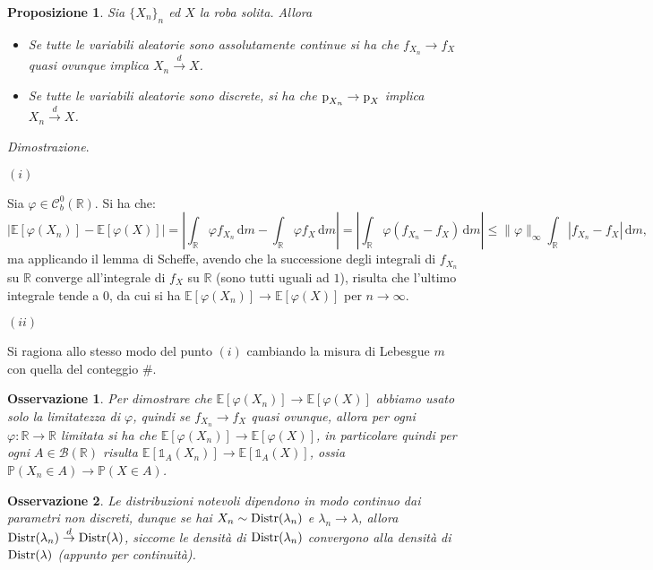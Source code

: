 \documentclass[11pt]{book}
\makeatletter
\theoremstyle{Definizione}
\theoremstyle{TeoremaProposizioneLemmaCorollario}
\newtheorem{mypropo}[myteo]{Proposizione}
\theoremstyle{OsservazioneNota}
\newtheorem{myobs}{Osservazione}[section]
\renewenvironment{proof}[1][\proofname]{\par
  \normalfont \topsep6\p@\@plus6\p@\relax
  \trivlist
  \item[\hskip\labelsep
        \itshape
    #1\@addpunct{.}]\ignorespaces
}{%
  \endtrivlist\@endpefalse
}
\newcommand{\R}{\mathbb{R}}
\renewcommand{\P}{\mathbb{P}}
\renewcommand{\d}{\mathrm{d}}
\newcommand{\dm}{\,\d \textit{m}}
\newcommand{\p}{\textup{p}}
\newcommand{\E}{\mathbb{E}}
\newcommand{\uno}[1]{\mathds{1}_{#1}}
\newcommand{\tod}{\overset{d}{\to}}
\renewenvironment{proof}{\textsl{Dimostrazione}.}{}
\makeatother
\begin{document}
\begin{boxpro}
\begin{mypropo}
Sia $\{X_n\}_n$ ed $X$ la roba solita. Allora
\begin{itemize}
\item[$(i)$] Se tutte le variabili aleatorie sono assolutamente continue si ha che $f_{X_n } \to f_X$ quasi ovunque implica $X_n \tod X$.
\item[$(ii)$] Se tutte le variabili aleatorie sono discrete, si ha che $\p_{X_n} \to \p_X$ implica $X_n\tod X$.
\end{itemize}
\end{mypropo}
\tcblower
\begin{proof}
\hfill
\begin{flushleft}
$(i)$
\end{flushleft}
Sia $\varphi\in \mathcal{C}_b^0(\R)$. Si ha che:
$$
\big|\E[\varphi(X_n)]-\E[\varphi(X)]\big| = \left|\int_\R \varphi f_{X_n} \dm -\int_\R \varphi f_{X}\dm\right| = \left|\int_\R \varphi(f_{X_n}-f_X)\dm\right|\leq \|\varphi\|_\infty \int_\R |f_{X_n}-f_{X}|\dm,
$$
ma applicando il lemma di Scheffe, avendo che la successione degli integrali di $f_{X_n}$ su $\R$ converge all'integrale di $f_X$ su $\R$ (sono tutti uguali ad $1$), risulta che l'ultimo integrale tende a $0$, da cui si ha $\E[\varphi(X_n)] \to \E[\varphi(X)]$ per $n\to \infty$.
\begin{flushleft}
$(ii)$
\end{flushleft}
Si ragiona allo stesso modo del punto $(i)$ cambiando la misura di Lebesgue $m$ con quella del conteggio $\#$.
\end{proof}
\end{boxpro}
\begin{myobs}
Per dimostrare che $\E[\varphi(X_n)] \to \E[\varphi(X)]$ abbiamo usato solo la limitatezza di $\varphi$, quindi se $f_{X_n} \to f_X$ quasi ovunque, allora per ogni $\varphi:\R\longrightarrow \R$ limitata si ha che $\E[\varphi(X_n)] \to \E[\varphi(X)]$, in particolare quindi per ogni $A\in \mathcal{B}(\R)$ risulta $\E[\uno{A}(X_n)] \to \E[\uno{A}(X)]$, ossia $\P(X_n \in A) \to \P(X \in A)$.
\end{myobs}
\begin{myobs}
Le distribuzioni notevoli dipendono in modo continuo dai parametri non discreti, dunque se hai $X_n \sim \textup{Distr}(\lambda_n)$ e $\lambda_n \to \lambda$, allora $\textup{Distr}(\lambda_n) \tod \textup{Distr}(\lambda)$, siccome le densità di $\textup{Distr}(\lambda_n)$ convergono alla densità di $\textup{Distr}(\lambda)$ (appunto per continuità).
\end{myobs}
\end{document}
